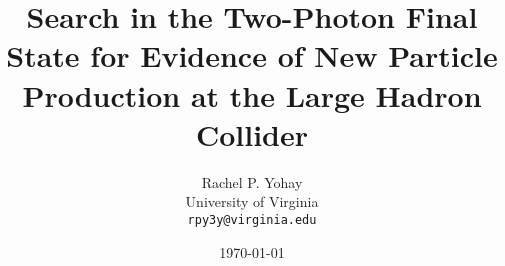 \documentclass[12pt, letterpaper]{report}
\begin{document}
\title{Search in the Two-Photon Final State for Evidence of New Particle Production at the Large Hadron Collider}
\author{Rachel P. Yohay \\
	University of Virginia \\
	\texttt{rpy3y@virginia.edu}}
\date{\today}
\maketitle

\tableofcontents

%





%

%



%

%

%


\end{document}
